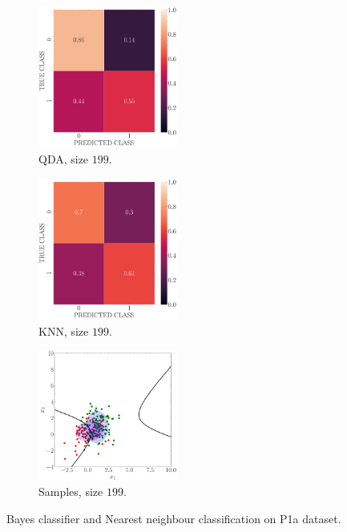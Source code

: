 \documentclass[12pt, a4 paper]{article}
\begin{document}
\begin{figure}[!htbp]
\quad \quad
    \begin{subfigure}[!htbp]{0.24\textwidth}
       \centering
       \includegraphics[width=1.8in]{../results/ex1/conf_mtx_QD_ML_dataset_P1a_size_199.pdf}
       \caption{QDA, size $199$.}
       \label{fig:QDA_P1a_199}
    \end{subfigure}
\quad \quad 
    \begin{subfigure}[!htbp]{0.24\textwidth}
       \centering
       \includegraphics[width=1.8in]{../results/ex1/conf_mtx_KNN_dataset_P1a_size_199.pdf}
       \caption{KNN, size $199$.}
       \label{fig:KNN_P1a_199}
    \end{subfigure}
\quad \quad
    \begin{subfigure}[!htbp]{0.24\textwidth}
       \centering
       \includegraphics[width=1.8in]{../results/ex1/samples_QD_ML_dataset_P1a_size_199.pdf}
       \caption{Samples, size $199$.}
       \label{fig:DF_P1a_199}
    \end{subfigure}

\caption{Bayes classifier and Nearest neighbour classification on P1a dataset.}
\label{fig:ex11P1a}
\end{figure}
\end{document}
